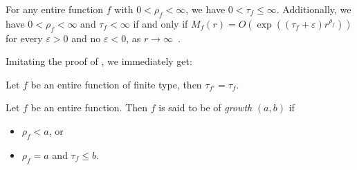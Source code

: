 For any entire function $f$ with $0 < \rho_f < \infty$, we have $0 < \tau_f \leq \infty$. Additionally, we have $0 < \rho_f < \infty$ and $\tau_f < \infty$ if and only if $M_f(r) = O(\exp((\tau_f + \varepsilon) r^{\rho_f}))$ for every $\varepsilon > 0$ and no $\varepsilon < 0$, as $r \to \infty$~\cite{segal-complex-analysis}.

Imitating the proof of , we immediately get:

\begin{proposition} \label{prop:type-derivative}
    Let $f$ be an entire function of finite type, then $\tau_{f'} = \tau_f$.
\end{proposition}

\begin{definition}
    Let $f$ be an entire function. Then $f$ is said to be of \emph{growth} $(a, b)$ if
    \begin{itemize}
        \item $\rho_f < a$, or
        \item $\rho_f = a$ and $\tau_f \leq b$.
    \end{itemize}
\end{definition}

\begin{example}
\end{example}
